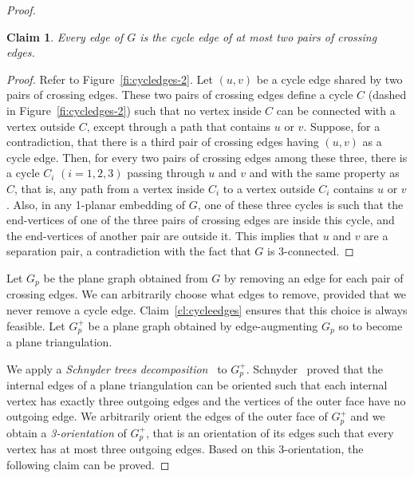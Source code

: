 \documentclass{article}
\newtheorem{claim}{Claim}
\begin{document}
\begin{proof}
\begin{claim}\label{cl:cycleedges-2}
Every edge of $G$ is the cycle edge of at most two pairs of crossing edges.
\end{claim}
\begin{proof}
Refer to Figure~\ref{fi:cycledges-2}. Let $(u,v)$ be a cycle edge shared by two pairs of crossing edges. These two pairs of crossing edges define a cycle $C$ (dashed in Figure~\ref{fi:cycledges-2}) such that no vertex inside $C$ can be connected with a vertex outside $C$, except through a path that contains $u$ or $v$. Suppose, for a contradiction, that there is a third pair of crossing edges having $(u,v)$ as a cycle edge. Then, for every two pairs of crossing edges among these three, there is a cycle $C_i$ $(i=1,2,3)$ passing through $u$ and $v$ and with the same property as $C$, that is, any path from a vertex inside $C_i$ to a vertex outside $C_i$ contains $u$ or $v$. Also, in any 1-planar embedding of $G$, one of these three cycles is such that the end-vertices of one of the three pairs of crossing edges are inside this cycle, and the end-vertices of another pair are outside it.  This implies that $u$ and $v$ are a separation pair, a contradiction with the fact that $G$ is 3-connected.
\end{proof}

Let $G_p$ be the plane graph obtained from $G$ by removing an edge for each pair of crossing edges. We can arbitrarily choose what edges to remove, provided that we never remove a cycle edge. Claim~\ref{cl:cycleedges} ensures that this choice is always feasible.  Let $G_p^+$ be a plane graph obtained by edge-augmenting $G_p$ so to become a plane triangulation.

We apply a {\em Schnyder trees decomposition}~\cite{DBLP:conf/soda/Schnyder90} to $G_p^+$. Schnyder~\cite{DBLP:conf/soda/Schnyder90} proved that the internal edges of a plane triangulation can be oriented such that each internal vertex has exactly three outgoing edges and the vertices of the outer face have no outgoing edge. We arbitrarily orient the edges of the outer face of $G_p^+$ and we obtain a {\em 3-orientation} of $G_p^+$, that is an orientation of its edges such that every vertex has at most three outgoing edges. Based on this 3-orientation, the following claim can be proved.



\end{proof}
\end{document}
